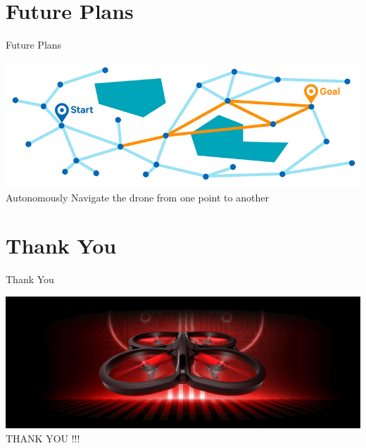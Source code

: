 \documentclass[10pt, a4paper]{beamer}
\begin{document}
\section{Future Plans}
\begin{frame}{Future Plans}
		\begin{center}
\includegraphics[scale=0.35]{auto_nav}\\
		Autonomously Navigate the drone from one point to another
\end{center}
\end{frame}


\section{Thank You}
\begin{frame}{Thank You}
\begin{center}
\includegraphics[scale=0.15]{parrot-ar-dronew_home}\\
	 THANK YOU !!!
	\end{center}
\end{frame}
\end{document}
